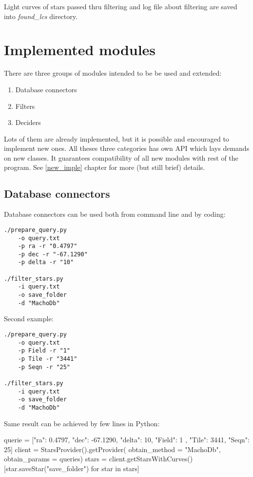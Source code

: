 \documentclass[final,5p,times,twocolumn,authoryear]{elsarticle}
\begin{document}
Light curves of stars passed thru filtering and log file about filtering are saved into \textit{found\_lcs} directory.

 

\section{Implemented modules} 


There are three groups of modules intended to be be used and extended:

\begin{enumerate}
\item Database connectors
\item Filters
\item Deciders
\end{enumerate}

Lots of them are already implemented, but it is possible and encouraged to implement new ones. All theses three categories has own API which lays demands on new classes. It guarantees compatibility of all new modules with rest of the program. See \ref{new_imple} chapter for more (but still brief) details.


\subsection{ Database connectors }
\label{ filtering_sec }

Database connectors can be used both from command line and by coding:

\begin{lstlisting}[caption = {Query MACHO database by scripts}, label={colors}]
./prepare_query.py
	-o query.txt
	-p ra -r "0.4797"
	-p dec -r "-67.1290"
	-p delta -r "10"
	
./filter_stars.py
	-i query.txt
	-o save_folder
	-d "MachoDb"
\end{lstlisting}

Second example:

\begin{lstlisting}[caption = {Query MACHO database by scripts}, label={colors}]
./prepare_query.py
	-o query.txt
	-p Field -r "1"
	-p Tile -r "3441"
	-p Seqn -r "25"
	
./filter_stars.py
	-i query.txt
	-o save_folder
	-d "MachoDb"
\end{lstlisting}

Same result can be achieved by few lines in Python:

\begin{python}
querie = [{"ra": 0.4797, "dec": -67.1290, "delta": 10},
         {"Field": 1 , "Tile": 3441, "Seqn": 25}]
client = StarsProvider().getProvider( obtain_method = "MachoDb", obtain_params = queries)
stars = client.getStarsWithCurves()
[star.saveStar("save_folder") for star in stars]
\end{python}
\end{document}
